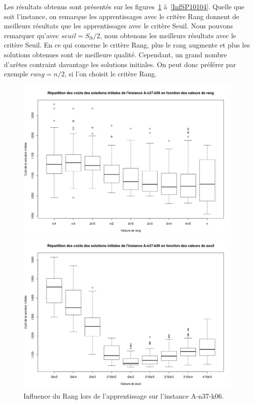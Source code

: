 \documentclass[a4paper,11pt]{article}%
\begin{document}
Les résultats obtenus sont présentés sur les figures~\ref{InfRA3706} à~\ref{InfSP10104}.
Quelle que soit l'instance, on remarque les apprentissages avec le critère Rang donnent de meilleurs résultats que les apprentissages avec le critère Seuil.
Nous pouvons remarquer qu'avec $ seuil = S_{lb}/2$, nous obtenons les meilleurs résultats avec le critère Seuil.
En ce qui concerne le critère Rang, plus le rang augmente et plus les solutions obtenues sont de meilleure qualité. Cependant, un grand nombre d'arêtes contraint davantage les solutions initiales. On peut donc préférer par exemple $rang = n/2$, si l'on choisit le critère Rang.

\begin{figure}
    \begin{minipage}[c]{.46\linewidth}

        \centering
        \includegraphics[scale=0.25]{InfluenceRangA3706}
        
        \caption{Influence du Rang lors de l'apprentissage sur l'instance A-n37-k06.}
        \label{InfRA3706}

    \end{minipage}
    \hfill%
    \begin{minipage}[c]{.46\linewidth}
        \centering
        \includegraphics[scale=0.25]{InfluenceSeuilA3706}
        

\end{minipage}
\end{figure}
\end{document}
